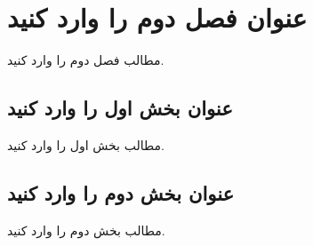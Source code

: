 %
%
%
%
\chapter{
عنوان فصل دوم را وارد کنید  
}\label{chap2} 

مطالب فصل دوم را وارد کنید.

\section{
عنوان بخش اول را وارد کنید  
}\label{sec21} 

مطالب بخش اول را وارد کنید.

\section{
عنوان بخش دوم را وارد کنید  
}\label{sec22} 

مطالب بخش دوم را وارد کنید.